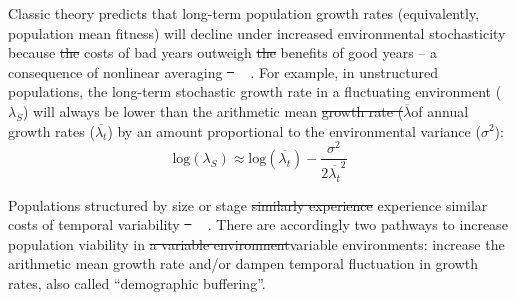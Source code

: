 \documentclass[lineno, sn-basic]{sn-jnl}%
\providecommand{\DIFadd}[1]{{\protect\color{blue}#1}} %
\providecommand{\DIFdel}[1]{{\protect\color{red}\protect\scriptsize\sout{#1}}}
\providecommand{\DIFadd}[1]{{\protect\color{blue}\uwave{#1}}} %
\providecommand{\DIFdel}[1]{{\protect\color{red}\sout{#1}}}                      %
\providecommand{\DIFaddbegin}{} %
\providecommand{\DIFaddend}{} %
\providecommand{\DIFdelbegin}{} %
\providecommand{\DIFdelend}{} %
\newcommand{\DIFscaledelfig}{0.5}
\newlength{\DIFdelgraphicswidth} %
\newlength{\DIFdelgraphicsheight} %
\newcommand{\DIFaddincludegraphics}[2][]{{\color{blue}\fbox{\DIFOincludegraphics[#1]{#2}}}} %
\newcommand{\DIFdelincludegraphics}[2][]{%
\sbox{\DIFdelgraphicsbox}{\DIFOincludegraphics[#1]{#2}}%
\settoboxwidth{\DIFdelgraphicswidth}{\DIFdelgraphicsbox} %
\settoboxtotalheight{\DIFdelgraphicsheight}{\DIFdelgraphicsbox} %
\scalebox{\DIFscaledelfig}{%
\parbox[b]{\DIFdelgraphicswidth}{\usebox{\DIFdelgraphicsbox}\\[-\baselineskip] \rule{\DIFdelgraphicswidth}{0em}}\llap{\resizebox{\DIFdelgraphicswidth}{\DIFdelgraphicsheight}{%
\setlength{\unitlength}{\DIFdelgraphicswidth}%
\begin{picture}(1,1)%
\thicklines\linethickness{2pt} %
{\color[rgb]{1,0,0}\put(0,0){\framebox(1,1){}}}%
{\color[rgb]{1,0,0}\put(0,0){\line( 1,1){1}}}%
{\color[rgb]{1,0,0}\put(0,1){\line(1,-1){1}}}%
\end{picture}%
}\hspace*{3pt}}} %
} %
\DeclareRobustCommand{\DIFaddbegin}{\DIFOaddbegin \let\includegraphics\DIFaddincludegraphics} %
\DeclareRobustCommand{\DIFaddend}{\DIFOaddend \let\includegraphics\DIFOincludegraphics} %
\DeclareRobustCommand{\DIFdelbegin}{\DIFOdelbegin \let\includegraphics\DIFdelincludegraphics} %
\DeclareRobustCommand{\DIFdelend}{\DIFOaddend \let\includegraphics\DIFOincludegraphics} %
\begin{document}
Classic theory predicts that long-term population growth rates (equivalently, population mean fitness) will decline under increased environmental stochasticity because \DIFdelbegin \DIFdel{the }\DIFdelend costs of bad years outweigh \DIFdelbegin \DIFdel{the }\DIFdelend benefits of good years -- a consequence of nonlinear averaging \DIFdelbegin \DIFdel{\mbox{%
\cite{lewontin_population_1969,tuljapurkar_population_1982}}\hspace{0pt}%
}\DIFdelend \DIFaddbegin \DIFadd{\mbox{%
\citep{lewontin_population_1969,tuljapurkar_population_1982}}\hspace{0pt}%
}\DIFaddend .
For example, in unstructured populations, the long-term stochastic growth rate in a fluctuating environment ($\lambda_S$) will always be lower than the arithmetic mean \DIFdelbegin \DIFdel{growth rate ($\overline{\lambda}$}\DIFdelend \DIFaddbegin \DIFadd{of annual growth rates ($\overline{\lambda_{t}}$}\DIFaddend ) by an amount proportional to the environmental variance ($\sigma^2$): 
\DIFdelbegin %
\DIFdelend \DIFaddbegin \begin{equation}
	\mbox{log}(\lambda_S)  \approx \mbox{log}(\overline{\lambda_{t}}) - \frac{\sigma^2}{2\overline{\lambda_{t}}^2}
\end{equation}
\DIFaddend 

\noindent Populations structured by size or stage \DIFdelbegin \DIFdel{similarly experience }\DIFdelend \DIFaddbegin \DIFadd{experience similar }\DIFaddend costs of temporal variability \DIFdelbegin \DIFdel{\mbox{%
\cite{cohen1979comparative, tuljapurkar2013population}}\hspace{0pt}%
}\DIFdelend \DIFaddbegin \DIFadd{\mbox{%
\citep{cohen1979comparative, tuljapurkar2013population}}\hspace{0pt}%
}\DIFaddend .
There are accordingly two pathways to increase population viability in \DIFdelbegin \DIFdel{a variable environment}\DIFdelend \DIFaddbegin \DIFadd{variable environments}\DIFaddend : increase the arithmetic mean growth rate and/or dampen temporal fluctuation in growth rates, also called ``demographic buffering''.
\end{document}
